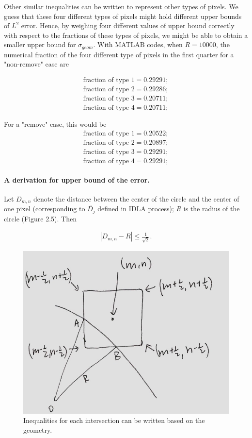 \documentclass[letterpaper]{article}
\numberwithin{equation}{section} %
\numberwithin{figure}{section} %
\numberwithin{table}{section} %
\begin{document}
\noindent
Other similar inequalities can be written to represent other types of pixels. We guess that these four different types of pixels might hold different upper bounds of $L^2$ error. Hence, by weighing four different values of upper bound correctly with respect to the fractions of these types of pixels, we might be able to obtain a smaller upper bound for $\sigma_{geom}$. With MATLAB codes, when $R=10000$, the numerical fraction of the four different type of pixels in the first quarter for a "non-remove" case are 

\begin{align} 
\text{fraction of type 1}=0.29291; \\
\text{fraction of type 2}=0.29286; \\
\text{fraction of type 3}=0.20711; \\
\text{fraction of type 4}=0.20711; 
\end{align}

\noindent
For a "remove" case, this would be
\begin{align} 
\text{fraction of type 1}=0.20522; \\
\text{fraction of type 2}=0.20897; \\
\text{fraction of type 3}=0.29291; \\
\text{fraction of type 4}=0.29291; 
\end{align}

\paragraph{A derivation for upper bound of the error.}
Let $D_{m,n}$ denote the distance between the center of the circle and the center of one pixel (corresponding to $\overline{D_j}$ defined in IDLA process); $R$ is the radius of the circle (Figure 2.5). Then 

\begin{align} 
|D_{m,n}-R| \leq \frac{1}{\sqrt{2}}.
\end{align}

\begin{figure}[h]
	\centering
	\includegraphics[width=0.5\linewidth]{4tyDeri}
	\caption{Inequalities for each intersection can be written based on the geometry.}
	\label{fig:4tyDeri}
\end{figure}
\end{document}
